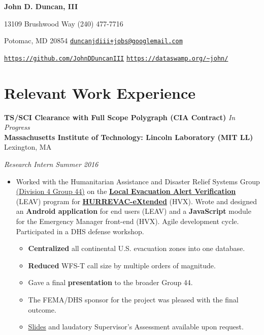 \documentclass[11pt]{article}
\begin{document}
\fancyfoot{}
\pagestyle{fancy}
\thispagestyle{empty}
\renewcommand{\headrulewidth}{0pt}
\renewcommand{\footrulewidth}{0pt}

\begin{center}
	{\huge \textbf{John D. Duncan, III}}
\end{center}
13109 Brushwood Way
\hfill
(240) 477-7716

Potomac, MD 20854
\hfill
\texttt{\href{mailto:duncanjdiii+jobs@googlemail.com}{duncanjdiii+jobs@googlemail.com}}

\texttt{\url{https://github.com/JohnDDuncanIII}}
\hfill
\texttt{\url{https://dataswamp.org/~john/}}

\section*{Relevant Work Experience}
\textbf{TS/SCI Clearance with Full Scope Polygraph (CIA Contract)}
\hfill
\textit{In Progress} \\


\textbf{Massachusetts Institute of Technology: Lincoln Laboratory (MIT LL)}
\hfill
Lexington, MA 

\textit{Research Intern}
\hfill
\textit{Summer 2016}

\begin{itemize}
	\item Worked with the Humanitarian Assistance and Disaster Relief Systems Group \href{https://www.ll.mit.edu/employment/division4.html#gp44}{(Division 4 Group 44)} on the \href{https://www.dhs.gov/publication/national-hurricane-program-technology-modernization-local-evacuation-alert-verification}{\textbf{Local Evacuation Alert Verification}} (LEAV) program for \href{https://www.dhs.gov/publication/national-hurricane-program-technology-modernization-hurrevac-extended-hv-x}{\textbf{HURREVAC-eXtended}} (HVX). Wrote and designed an \textbf{Android application} for end users (LEAV) and a \textbf{JavaScript} module for the Emergency Manager front-end (HVX). Agile development cycle. Participated in a DHS defense workshop.
	\begin{itemize}[noitemsep]
		\item \textbf{Centralized} all continental U.S. evacuation zones into one database.
		\item \textbf{Reduced} WFS-T call size by multiple orders of magnitude.
		\item Gave a final \textbf{presentation} to the broader Group 44. 
		\item The FEMA/DHS sponsor for the project was pleased with the final outcome.
		\item \href{https://docs.google.com/presentation/d/1d6u7eK2fBJElrRpEn1KlkTfReKO_tHj5iCAGb6vgtmg/}{Slides} and laudatory Supervisor's Assessment available upon request.
	\end{itemize}
\end{itemize}
\end{document}
